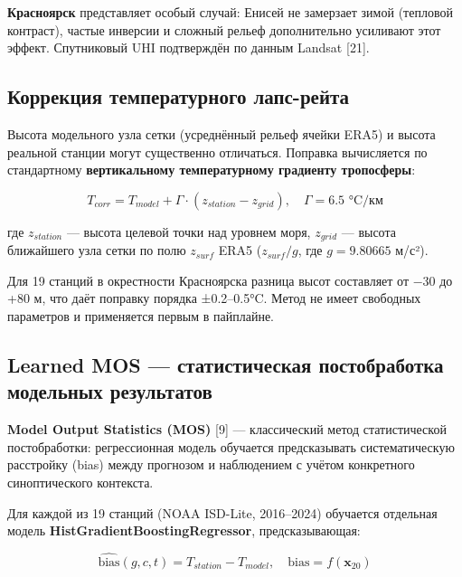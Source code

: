 \documentclass[14pt,a4paper]{extarticle}
\numberwithin{table}{section}
\numberwithin{figure}{section}
\numberwithin{equation}{section}
\begin{document}
\textbf{Красноярск} представляет особый случай: Енисей не замерзает
зимой (тепловой контраст), частые инверсии и сложный рельеф
дополнительно усиливают этот эффект. Спутниковый UHI подтверждён по
данным Landsat {[}21{]}.

\subsection{Коррекция температурного лапс-рейта}\label{ux43aux43eux440ux440ux435ux43aux446ux438ux44f-ux442ux435ux43cux43fux435ux440ux430ux442ux443ux440ux43dux43eux433ux43e-ux43bux430ux43fux441-ux440ux435ux439ux442ux430}

Высота модельного узла сетки (усреднённый рельеф ячейки ERA5) и высота
реальной станции могут существенно отличаться. Поправка вычисляется по
стандартному \textbf{вертикальному температурному градиенту тропосферы}:

\[T_{corr} = T_{model} + \Gamma \cdot (z_{station} - z_{grid}), \quad \Gamma = 6.5 \text{ °C/км}\]

где \(z_{station}\) --- высота целевой точки над уровнем моря,
\(z_{grid}\) --- высота ближайшего узла сетки по полю \(z_{surf}\) ERA5
(\(z_{surf}/g\), где \(g = 9.80665\) м/с²).

Для 19 станций в окрестности Красноярска разница высот составляет от −30
до +80 м, что даёт поправку порядка ±0.2--0.5°C. Метод не имеет
свободных параметров и применяется первым в пайплайне.

\subsection{Learned MOS --- статистическая постобработка
модельных результатов}\label{learned-mos-ux441ux442ux430ux442ux438ux441ux442ux438ux447ux435ux441ux43aux430ux44f-ux43fux43eux441ux442ux43eux431ux440ux430ux431ux43eux442ux43aux430-ux43cux43eux434ux435ux43bux44cux43dux44bux445-ux440ux435ux437ux443ux43bux44cux442ux430ux442ux43eux432}

\textbf{Model Output Statistics (MOS)} {[}9{]} --- классический метод
статистической постобработки: регрессионная модель обучается
предсказывать систематическую расстройку (bias) между прогнозом и
наблюдением с учётом конкретного синоптического контекста.

Для каждой из 19 станций (NOAA ISD-Lite, 2016--2024) обучается отдельная
модель \textbf{HistGradientBoostingRegressor}, предсказывающая:

\[\widehat{\text{bias}}(g, c, t) = T_{station} - T_{model}, \quad \text{bias} = f(\mathbf{x}_{20})\]
\end{document}
